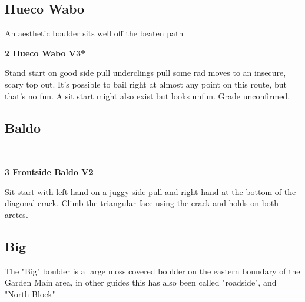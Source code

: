 \begin{multicols}{2}
			\subsection*{Hueco Wabo}\label{bf:Hueco Wabo}
			\begin{minipage}{\columnwidth}
			An aesthetic boulder sits well off the beaten path
			\end{minipage}
			

					\begin{minipage}{\linewidth}	
					\label{rt:Hueco Wabo}
\colorbox{green!20}{
\parbox{0.95\textwidth}{
\textbf{
2 Hueco Wabo V3*  
}
}
}

					\begin{adjustwidth}{0.5cm}{}				
					Stand start on good side pull underclings pull some rad moves to an insecure, scary top out. It's possible to bail right at almost any point on this route, but that's no fun. A sit start might also exist but looks unfun. Grade unconfirmed.
					\end{adjustwidth}
					\end{minipage}
			\subsection*{Baldo}\label{bf:Baldo}
			\begin{minipage}{\columnwidth}
			\
			\end{minipage}
			

					\begin{minipage}{\linewidth}	
					\label{rt:Frontside Baldo}
\colorbox{green!20}{
\parbox{0.95\textwidth}{
\textbf{
3 Frontside Baldo V2    
}
}
}

					\begin{adjustwidth}{0.5cm}{}				
					Sit start with left hand on a juggy side pull and right hand at the bottom of the diagonal crack. Climb the triangular face using the crack and holds on both aretes.
					\end{adjustwidth}
					\end{minipage}
			\subsection*{Big}\label{bf:Big}
			\begin{minipage}{\columnwidth}
			The "Big" boulder is a large moss covered boulder on the eastern boundary of the Garden Main area, in other guides this has also been called "roadside", and "North Block"
			\end{minipage}
			

\end{multicols}

